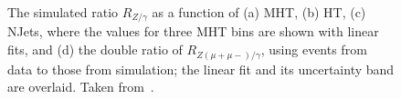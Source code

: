 \begin{figure}[!h]
  \centering
{}
  \caption{The simulated ratio $R_{Z/\gamma}$ as a function of (a) MHT, (b) HT, (c) NJets, where the values for three MHT bins are shown with linear fits, and (d) the double ratio of $R_{Z(\mu+\mu-)/\gamma}$, using events from data to those from simulation; the linear fit and its uncertainty band are overlaid. Taken from~\cite{Chatrchyan:2014lfa}.}
  \label{fig:ra2_zinv}
\end{figure}

